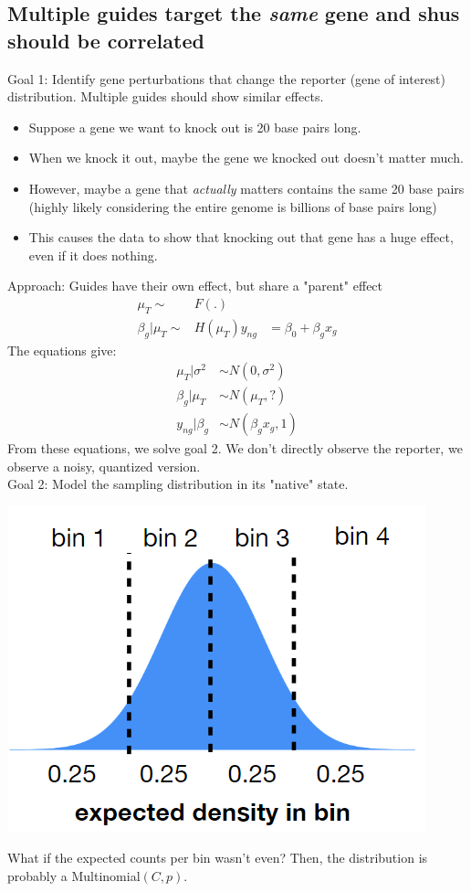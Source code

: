 \documentclass[10pt]{article}
\begin{document}
\subsection*{Multiple guides target the \textit{same} gene and shus should be correlated}
Goal 1: Identify gene perturbations that change the reporter (gene of interest) distribution.  Multiple guides should show similar effects.
\begin{itemize}
    \item Suppose a gene we want to knock out is 20 base pairs long.
    \item When we knock it out, maybe the gene we knocked out doesn't matter much.
    \item However, maybe a gene that \textit{actually} matters contains the same 20 base pairs (highly likely considering the entire genome is billions of base pairs long)
    \item This causes the data to show that knocking out that gene has a huge effect, even if it does nothing.
\end{itemize}
Approach: Guides have their own effect, but share a "parent" effect
\begin{align*}
    \mu_T \sim& F(.) \\
    \beta_g \vert \mu_T \sim& H(\mu_T)
    y_{ng} &= \beta_0 + \beta_g x_g
\end{align*}
The equations give:
\begin{align*}
    \mu_T \vert \sigma^2 &\sim N(0, \sigma^2)\\
    \beta_g \vert \mu_T &\sim N(\mu_T, ?)\\
    y_{ng} \vert \beta_g &\sim N(\beta_g x_g, 1)
\end{align*}
From these equations, we solve goal 2.  We don't directly observe the reporter, we observe a noisy, quantized version.\\
Goal 2: Model the sampling distribution in its "native" state.
\begin{center}
    \includegraphics*[scale=0.8]{W10_1.png}
\end{center}    
What if the expected counts per bin wasn't even?  Then, the distribution is probably a Multinomial$(C, p)$.
\end{document}
